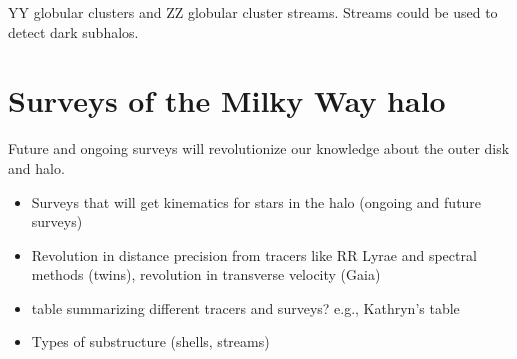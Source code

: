 YY globular clusters and ZZ globular cluster streams. Streams could be used to detect dark subhalos. 

\section{Surveys of the Milky Way halo}\label{sec:surveys}

Future and ongoing surveys will revolutionize our knowledge about the outer disk and halo.

\begin{itemize}
	\item Surveys that will get kinematics for stars in the halo (ongoing and future surveys)
	\item Revolution in distance precision from tracers like RR Lyrae and spectral methods (twins), revolution in transverse velocity (Gaia)
	\item table summarizing different tracers and surveys? e.g., Kathryn's table
	\item Types of substructure (shells, streams)
\end{itemize}



